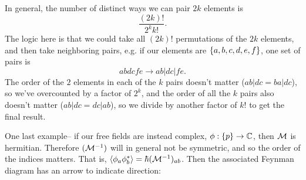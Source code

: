 \begin{exm}
    In general, the number of distinct ways we can pair $2k$ elements is
    \begin{equation*}
        \frac{(2k)!}{2^k  k!}.
    \end{equation*}
    The logic here is that we could take all $(2k)!$ permutations of the $2k$ elements, and then take neighboring pairs, e.g. if our elements are $\{a,b,c,d,e,f\}$, one set of pairs is
    \begin{equation*}
        abdcfe\to ab|dc|fe.
    \end{equation*}
    The order of the $2$ elements in each of the $k$ pairs doesn't matter ($ab|dc=ba|dc$), so we've overcounted by a factor of $2^k$, and the order of all the $k$ pairs also doesn't matter ($ab|dc=dc|ab$), so we divide by another factor of $k!$ to get the final result.
\end{exm}

\begin{exm}
    One last example-- if our free fields are instead complex, $\phi:\{p\}\to \mathbb{C}$, then $\mathcal{M}$ is hermitian. Therefore $(\mathcal{M}^{-1})$ will in general not be symmetric, and so the order of the indices matters. That is, $\left< \phi_a \phi_b^* \right>=\hbar (\mathcal{M}^{-1})_{ab}$. Then the associated Feynman diagram has an arrow to indicate direction:
    
    \begin{center}
    \end{center}
\end{exm}

